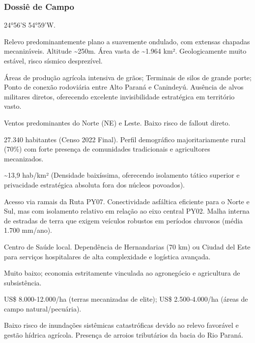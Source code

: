 \subsubsection{Dossiê de Campo}
\begin{description}[style=nextline,leftmargin=0.5cm,font=\bfseries]
\item[Coordenadas]  24°56'S 54°59'W.
\item[Topografia]  Relevo predominantemente plano a suavemente ondulado, com extensas chapadas mecanizáveis. Altitude \textasciitilde 250m. Área vasta de \textasciitilde 1.964 km². Geologicamente muito estável, risco sísmico desprezível.
\item[Alvos Estratégicos]  Áreas de produção agrícola intensiva de grãos; Terminais de silos de grande porte; Ponto de conexão rodoviária entre Alto Paraná e Canindeyú. Ausência de alvos militares diretos, oferecendo excelente invisibilidade estratégica em território vasto.
\item[Fallout]  Ventos predominantes do Norte (NE) e Leste. Baixo risco de fallout direto.
\item[População]  27.340 habitantes (Censo 2022 Final). Perfil demográfico majoritariamente rural (70\%) com forte presença de comunidades tradicionais e agricultores mecanizados.
\item[Densidade]  \textasciitilde 13,9 hab/\allowbreak km² (Densidade baixíssima, oferecendo isolamento tático superior e privacidade estratégica absoluta fora dos núcleos povoados).
\item[Vias de Acesso]  Acesso via ramais da Ruta PY07. Conectividade asfáltica eficiente para o Norte e Sul, mas com isolamento relativo em relação ao eixo central PY02. Malha interna de estradas de terra que exigem veículos robustos em períodos chuvosos (média 1.700 mm/\allowbreak ano).
\item[Serviços]  Centro de Saúde local. Dependência de Hernandarias (70 km) ou Ciudad del Este para serviços hospitalares de alta complexidade e logística avançada.
\item[Custo de Vida]  Muito baixo; economia estritamente vinculada ao agronegócio e agricultura de subsistência.
\item[Preço da Terra]  US\$ 8.000-12.000/\allowbreak ha (terras mecanizadas de elite); US\$ 2.500-4.000/\allowbreak ha (áreas de campo natural/\allowbreak pecuária).
\item[Hidrologia]  Baixo risco de inundações sistêmicas catastróficas devido ao relevo favorável e gestão hídrica agrícola. Presença de arroios tributários da bacia do Rio Paraná.

\end{description}
